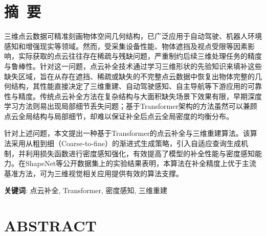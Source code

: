 \newpage

\setcounter{page}{1} %

{
\let\clearpage\relax%
\chapter*{摘\ 要}
}

三维点云数据可精准刻画物体空间几何结构，已广泛应用于自动驾驶、机器人环境感知和增强现实等领域。然而，受采集设备性能、物体遮挡及视点受限等因素影响，实际获取的点云往往存在稀疏与残缺问题，严重制约后续三维处理任务的精度与鲁棒性。针对这一问题，点云补全技术通过学习三维形状的先验知识来填补这些缺失区域，旨在从存在遮挡、稀疏或缺失的不完整点云数据中恢复出物体完整的几何结构，其性能直接决定了三维重建、自动驾驶感知、自主导航等下游应用的可靠性与精度。传统点云补全方法在复杂结构与大面积缺失场景下效果有限，早期深度学习方法则易出现局部细节丢失问题；基于Transformer架构的方法虽然可以兼顾点云全局结构与局部细节，却难以保证补全后点云全局密度的均衡分布。

针对上述问题，本文提出一种基于Transformer的点云补全与三维重建算法。该算法采用从粗到细（Coarse-to-fine）的渐进式生成策略，引入自适应查询生成机制，并利用损失函数进行密度感知强化，有效提高了模型的补全性能与密度感知能力。在ShapeNet等公开数据集上的实验结果表明，本算法在补全精度上优于主流基准方法，可为三维视觉相关应用提供有效的算法支撑。

\vspace{8mm}
\textbf{关键词}: 点云补全, Transformer, 密度感知, 三维重建

\newpage
{
\let\clearpage\relax%
\chapter*{ABSTRACT}
}

